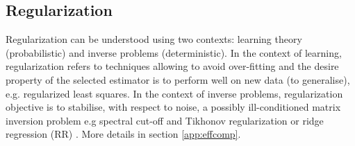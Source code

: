 







\subsection{Regularization}\label{sec:regularization}

Regularization can be understood using two contexts: learning theory
(probabilistic) and inverse problems (deterministic). In the context of
learning, regularization refers to techniques allowing to avoid over-fitting and
the desire property of the selected estimator is to perform well on new data (to
generalise), e.g. regularized least squares. In the context of inverse problems,
regularization objective is to stabilise, with respect to noise, a possibly
ill-conditioned matrix inversion problem e.g spectral cut-off and Tikhonov
regularization or ridge regression (RR) \cite{ tikhonov1977}. More details in section \ref{app:effcomp}.

